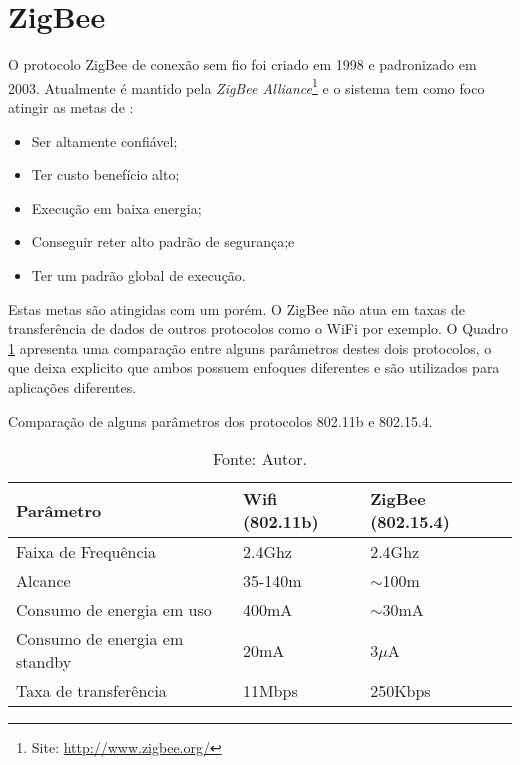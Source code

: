 \section{ZigBee}
\label{sec:zigbee}
 O protocolo ZigBee de conexão sem fio foi criado em 1998 e padronizado em 2003. Atualmente é mantido pela \textit{ZigBee Alliance}\footnote[1]{Site: \url{http://www.zigbee.org/}} e o sistema tem como foco atingir as metas de \cite{gislason2008zigbee}:

 \begin{itemize}
 	\item Ser altamente confiável;
 	\item Ter custo benefício alto;
 	\item Execução em baixa energia;
 	\item Conseguir reter alto padrão de segurança;e
 	\item Ter um padrão global de execução.
 \end{itemize}

Estas metas são atingidas com um porém. O ZigBee não atua em taxas de transferência de dados de outros protocolos como o WiFi por exemplo. O Quadro \ref{tab:protocolscomparition} apresenta uma comparação entre alguns parâmetros destes dois protocolos, o que deixa explicito que ambos possuem enfoques diferentes e são utilizados para aplicações diferentes.

\begin{table}[]
\centering
\caption{Comparação de alguns parâmetros dos protocolos 802.11b e 802.15.4.}
\label{tab:protocolscomparition}
\begin{tabular}{|l|l|l|}
\hline
\rowcolor[HTML]{C0C0C0} 
\textbf{Parâmetro}            & \textbf{Wifi (802.11b)} & \textbf{ZigBee (802.15.4)} \\ \hline
Faixa de Frequência           & 2.4Ghz                  & 2.4Ghz                     \\ \hline
Alcance                       & 35-140m                 & $\sim$100m                 \\ \hline
Consumo de energia em uso     & 400mA                   & $\sim$30mA                 \\ \hline
Consumo de energia em standby & 20mA                    & 3$\mu$A                        \\ \hline
Taxa de transferência         & 11Mbps                  & 250Kbps                    \\ \hline
\end{tabular}
\caption*{Fonte: Autor.}
\end{table}


